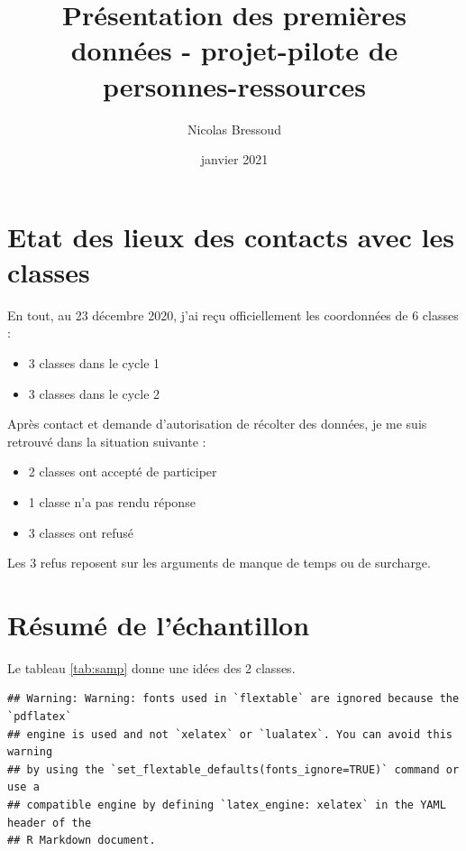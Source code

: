 \documentclass[
]{article}
\title{Présentation des premières données - projet-pilote de personnes-ressources}
\author{Nicolas Bressoud}
\date{janvier 2021}
\providecommand{\tightlist}{%
  \setlength{\itemsep}{0pt}\setlength{\parskip}{0pt}}
\begin{document}
\maketitle

{
\setcounter{tocdepth}{2}
\tableofcontents
}
\hypertarget{etat-des-lieux-des-contacts-avec-les-classes}{%
\section{Etat des lieux des contacts avec les classes}\label{etat-des-lieux-des-contacts-avec-les-classes}}

En tout, au 23 décembre 2020, j'ai reçu officiellement les coordonnées de 6 classes :

\begin{itemize}
\tightlist
\item
  3 classes dans le cycle 1
\item
  3 classes dans le cycle 2
\end{itemize}

Après contact et demande d'autorisation de récolter des données, je me suis retrouvé dans la situation suivante :

\begin{itemize}
\tightlist
\item
  2 classes ont accepté de participer
\item
  1 classe n'a pas rendu réponse
\item
  3 classes ont refusé
\end{itemize}

Les 3 refus reposent sur les arguments de manque de temps ou de surcharge.

\hypertarget{ruxe9sumuxe9-de-luxe9chantillon}{%
\section{Résumé de l'échantillon}\label{ruxe9sumuxe9-de-luxe9chantillon}}

Le tableau \ref{tab:samp} donne une idées des 2 classes.

\begin{verbatim}
## Warning: Warning: fonts used in `flextable` are ignored because the `pdflatex`
## engine is used and not `xelatex` or `lualatex`. You can avoid this warning
## by using the `set_flextable_defaults(fonts_ignore=TRUE)` command or use a
## compatible engine by defining `latex_engine: xelatex` in the YAML header of the
## R Markdown document.
\end{verbatim}
\end{document}
